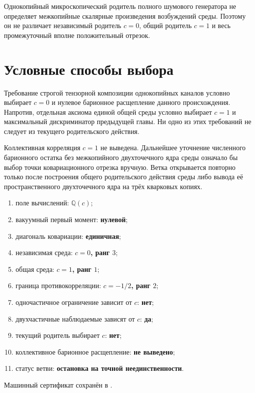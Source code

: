 \begin{theorem}
Однокопийный микроскопический родитель полного шумового генератора не
определяет межкопийные скалярные произведения возбуждений среды. Поэтому он
не различает независимый родитель $c=0$, общий родитель $c=1$ и весь
промежуточный вполне положительный отрезок.
\end{theorem}

\section{Условные способы выбора}

Требование строгой тензорной композиции однокопийных каналов условно
выбирает $c=0$ и нулевое барионное расщепление данного происхождения.
Напротив, отдельная аксиома единой общей среды условно выбирает $c=1$ и
максимальный дискриминатор предыдущей главы. Ни одно из этих требований не
следует из текущего родительского действия.

\begin{nogocriterion}
Коллективная корреляция $c=1$ не выведена. Дальнейшее уточнение численного
барионного остатка без межкопийного двухточечного ядра среды означало бы
выбор точки ковариационного отрезка вручную. Ветка открывается повторно
только после построения общего родительского действия среды либо вывода её
пространственного двухточечного ядра на трёх кварковых копиях.
\end{nogocriterion}

\begin{protocol}
\begin{enumerate}
 \item поле вычислений: \textbf{$\mathbb Q(c)$};
 \item вакуумный первый момент: \textbf{нулевой};
 \item диагональ ковариации: \textbf{единичная};
 \item независимая среда: \textbf{$c=0$, ранг $3$};
 \item общая среда: \textbf{$c=1$, ранг $1$};
 \item граница противокорреляции: \textbf{$c=-1/2$, ранг $2$};
 \item одночастичное ограничение зависит от $c$: \textbf{нет};
 \item двухчастичные наблюдаемые зависят от $c$: \textbf{да};
 \item текущий родитель выбирает $c$: \textbf{нет};
 \item коллективное барионное расщепление: \textbf{не выведено};
 \item статус ветви: \textbf{остановка на точной неединственности}.
\end{enumerate}
\end{protocol}

Машинный сертификат сохранён в
.